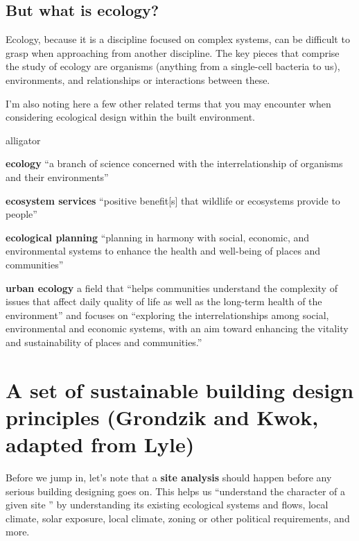 \documentclass[10pt]{article}
\begin{document}
\subsection{But what is ecology?}

Ecology, because it is a discipline focused on complex systems, can be difficult to grasp when approaching from another discipline. The key pieces that comprise the study of ecology are organisms (anything from a single-cell bacteria to us), environments, and relationships or interactions between these. 

I'm also noting here a few other related terms that you may encounter when considering ecological design within the built environment.

\begin{labeling}{alligator}
\item [\textbf{ecology}] ``a branch of science concerned with the interrelationship of organisms and their environments'' \cite{noauthor_undated-yl}
\item [\textbf{ecosystem services}] ``positive benefit[s] that wildlife or ecosystems provide to people'' \cite{noauthor_undated-xo}
\item [\textbf{ecological planning}] ``planning in harmony with social, economic, and environmental systems to enhance the health and well-being of places and communities'' \cite{noauthor_undated-lq}
\item [\textbf{urban ecology}] a field that ``helps communities understand the complexity of issues that affect daily quality of life as well as the long-term health of the environment'' and focuses on ``exploring the interrelationships among social, environmental and economic systems, with an aim toward enhancing the vitality and sustainability of places and communities.'' \cite{noauthor_undated-qo}
\end{labeling}

\section{A set of sustainable building design principles (Grondzik and Kwok, adapted from Lyle)}


Before we jump in, let's note that a \textbf{site analysis} should happen before any serious building designing goes on. This helps us ``understand the character of a given site \cite{Grondzik2014-gt}'' by understanding its existing ecological systems and flows, local climate, solar exposure, local climate, zoning or other political requirements, and more. 
\end{document}
